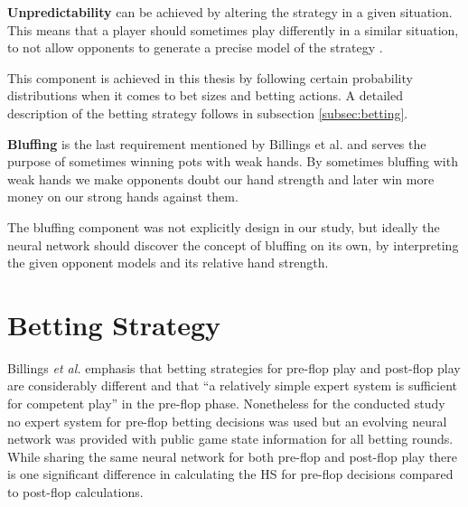 \textbf{Unpredictability} can be achieved by altering the strategy in a given situation. This means that a player should sometimes play differently in a similar situation, to not allow opponents to generate a precise model of the strategy \cite{challenge_of_poker}. \par
This component is achieved in this thesis by following certain probability distributions when it comes to bet sizes and betting actions. A detailed description of the betting strategy follows in subsection \ref{subsec:betting}.\par
\textbf{Bluffing} is the last requirement mentioned by Billings et al. \cite{challenge_of_poker} and serves the purpose of sometimes winning pots with weak hands. By sometimes bluffing with weak hands we make opponents doubt our hand strength and later win more money on our strong hands against them. \par
The bluffing component was not explicitly design in our study, but ideally the neural network should discover the concept of bluffing on its own, by interpreting the given opponent models and its relative hand strength.
\section{Betting Strategy}
Billings \textit{et al.} \cite[p.~210]{challenge_of_poker} emphasis that betting strategies for pre-flop play and post-flop play are considerably different and that \enquote{a relatively simple expert system is sufficient for competent play} in the pre-flop phase. Nonetheless for the conducted study no expert system for pre-flop betting decisions was used but an evolving neural network was provided with public game state information for all betting rounds. While sharing the same neural network for both pre-flop and post-flop play there is one significant difference in calculating the HS for pre-flop decisions compared to post-flop calculations.
